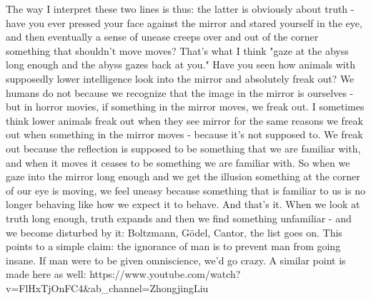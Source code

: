 The way I interpret these two lines is thus: the latter is obviously about truth - have you ever pressed your face against the mirror and stared yourself in the eye, and then eventually a sense of unease creeps over and out of the corner something that shouldn't move moves? That's what I think "gaze at the abyss long enough and the abyss gazes back at you." Have you seen how animals with supposedly lower intelligence look into the mirror and absolutely freak out? We humans do not because we recognize that the image in the mirror is ourselves - but in horror movies, if something in the mirror moves, we freak out. I sometimes think lower animals freak out when they see mirror for the same reasons we freak out when something in the mirror moves - because it's not supposed to. We freak out because the reflection is supposed to be something that we are familiar with, and when it moves it ceases to be something we are familiar with. So when we gaze into the mirror long enough and we get the illusion something at the corner of our eye is moving, we feel uneasy because something that is familiar to us is no longer behaving like how we expect it to behave. And that's it. When we look at truth long enough, truth expands and then we find something unfamiliar - and we become disturbed by it: Boltzmann, Gödel, Cantor, the list goes on. This points to a simple claim: the ignorance of man is to prevent man from going insane. If man were to be given omniscience, we'd go crazy. A similar point is made here as well:  https://www.youtube.com/watch?v=FlHxTjOnFC4&ab_channel=ZhongjingLiu%

